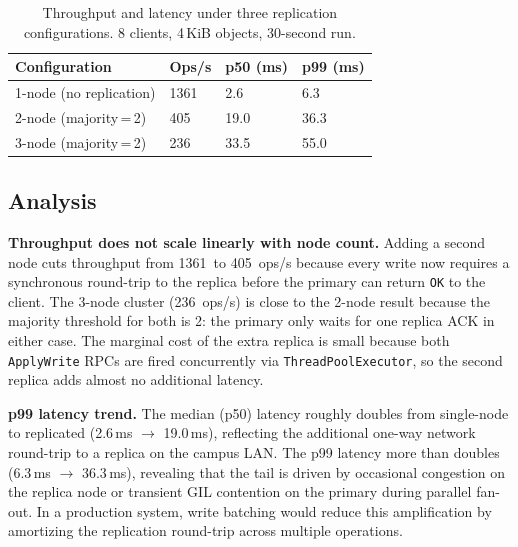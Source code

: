 \documentclass[11pt,letterpaper]{article}
\newcommand{\BTwoOneOps}{1361}     %
\newcommand{\BTwoTwoOps}{405}     %
\newcommand{\BTwoThreeOps}{236}   %
\newcommand{\BTwoOnePFifty}{2.6}
\newcommand{\BTwoTwoPFifty}{19.0}
\newcommand{\BTwoThreePFifty}{33.5}
\newcommand{\BTwoOnePNN}{6.3}
\newcommand{\BTwoTwoPNN}{36.3}
\newcommand{\BTwoThreePNN}{55.0}
\begin{document}
\begin{table}[h]
\centering
\caption{Throughput and latency under three replication configurations.
         8 clients, 4\,KiB objects, 30-second run.}
\label{tab:bench2}
\small
\begin{tabular}{@{}
    L{4.5cm}
    R{1.8cm} R{1.8cm} R{1.8cm}
    @{}}
\toprule
\textbf{Configuration}
  & \textbf{Ops/s}
  & \textbf{p50 (ms)}
  & \textbf{p99 (ms)} \\
-node (no replication)     & \BTwoOneOps   & \BTwoOnePFifty   & \BTwoOnePNN   \\
2-node (majority\,=\,2)     & \BTwoTwoOps   & \BTwoTwoPFifty   & \BTwoTwoPNN   \\
3-node (majority\,=\,2)     & \BTwoThreeOps & \BTwoThreePFifty & \BTwoThreePNN \\
\bottomrule
\end{tabular}
\end{table}

\subsection{Analysis}

\textbf{Throughput does not scale linearly with node count.}
Adding a second node cuts throughput from \BTwoOneOps\ to \BTwoTwoOps\ ops/s
because every write now requires a synchronous round-trip to the replica
before the primary can return \texttt{OK} to the client.
The 3-node cluster (\BTwoThreeOps\ ops/s) is close to the 2-node result
because the majority threshold for both is 2: the primary only waits for one
replica ACK in either case.
The marginal cost of the extra replica is small because both
\texttt{ApplyWrite} RPCs are fired concurrently via \texttt{ThreadPoolExecutor},
so the second replica adds almost no additional latency.

\textbf{p99 latency trend.}
The median (p50) latency roughly doubles from single-node to replicated
(\BTwoOnePFifty\,ms $\to$ \BTwoTwoPFifty\,ms), reflecting the additional
one-way network round-trip to a replica on the campus LAN.
The p99 latency more than doubles (\BTwoOnePNN\,ms $\to$ \BTwoTwoPNN\,ms),
revealing that the tail is driven by occasional congestion on the replica node
or transient GIL contention on the primary during parallel fan-out.
In a production system, write batching would reduce this amplification by
amortizing the replication round-trip across multiple operations.


\end{document}
